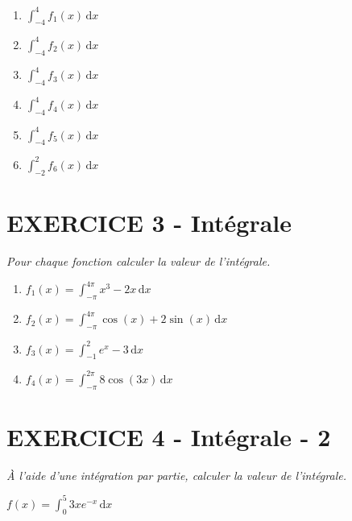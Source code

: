 \documentclass[11pt]{article}
\begin{document}
\begin{multicols}{3}

  \begin{enumerate}
  \item $ \int_{-4}^{4} f_{1}(x) \, \mathrm dx $
  \item $ \int_{-4}^{4} f_2(x) \, \mathrm dx $
  \item $ \int_{-4}^{4} f_3(x) \, \mathrm dx $
  \item $ \int_{-4}^{4} f_4(x) \, \mathrm dx $
  \item $ \int_{-4}^{4} f_5(x) \, \mathrm dx $
  \item $ \int_{-2}^{2} f_6(x) \, \mathrm dx $
  \end{enumerate}
\end{multicols}

  \section*{EXERCICE 3 - Intégrale}
  \textit{Pour chaque fonction calculer la valeur de l'intégrale.}

  \begin{enumerate}
  \item $f_{1}(x) = \int_{- \pi}^{4\pi} x^3 - 2x           \, \mathrm dx $
  \item $f_{2}(x) = \int_{- \pi}^{4\pi} \cos(x) + 2\sin(x) \, \mathrm dx $
  \item $f_{3}(x) = \int_{-1}^{2}      e^{x} - 3          \, \mathrm dx $
  \item $f_{4}(x) = \int_{- \pi}^{2\pi} 8\cos(3x)          \, \mathrm dx $
  \end{enumerate}


  \section*{EXERCICE 4 - Intégrale - 2}
  \textit{À l'aide d'une intégration par partie, calculer la valeur de l'intégrale.}

$f(x) = \int_{0}^{5} 3x e^{-x} \, \mathrm dx $
\end{document}
